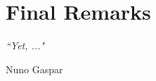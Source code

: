 
\chapter{Final Remarks} 
\label{chap:conclusion} 

\epigraph{\textit{“Yet, ..."}}{Nuno Gaspar}



\minitoc









